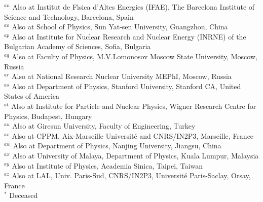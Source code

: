 \begin{flushleft}
$^{an}$ Also at Institut de F{\'\i}sica d'Altes Energies (IFAE), The Barcelona Institute of Science and Technology, Barcelona, Spain\\
$^{ao}$ Also at School of Physics, Sun Yat-sen University, Guangzhou, China\\
$^{ap}$ Also at Institute for Nuclear Research and Nuclear Energy (INRNE) of the Bulgarian Academy of Sciences, Sofia, Bulgaria\\
$^{aq}$ Also at Faculty of Physics, M.V.Lomonosov Moscow State University, Moscow, Russia\\
$^{ar}$ Also at National Research Nuclear University MEPhI, Moscow, Russia\\
$^{as}$ Also at Department of Physics, Stanford University, Stanford CA, United States of America\\
$^{at}$ Also at Institute for Particle and Nuclear Physics, Wigner Research Centre for Physics, Budapest, Hungary\\
$^{au}$ Also at Giresun University, Faculty of Engineering, Turkey\\
$^{av}$ Also at CPPM, Aix-Marseille Universit{\'e} and CNRS/IN2P3, Marseille, France\\
$^{aw}$ Also at Department of Physics, Nanjing University, Jiangsu, China\\
$^{ax}$ Also at University of Malaya, Department of Physics, Kuala Lumpur, Malaysia\\
$^{ay}$ Also at Institute of Physics, Academia Sinica, Taipei, Taiwan\\
$^{az}$ Also at LAL, Univ. Paris-Sud, CNRS/IN2P3, Universit{\'e} Paris-Saclay, Orsay, France\\
$^{*}$ Deceased
\end{flushleft}

%
